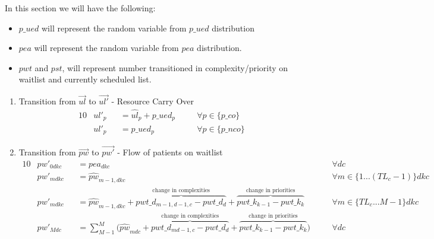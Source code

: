 In this section we will have the following:
\begin{itemize}
	\item $p\_ued$ will represent the random variable from $p\_ued$ distribution 
	\item $pea$ will represent the random variable from $pea$ distribution. 
	\item $pwt$ and $pst$, will represent number transitioned in complexity/priority on waitlist and currently scheduled list.
\end{itemize}


\begin{enumerate}
	\item Transition from $\vec{ul}$ to $\vec{ul'}$ - Resource Carry Over
	\begin{alignat}{10}
		& ul'_{p} 
		&& = \hat{ul}_{p} + p\_ued_{p} \quad 
		&& \forall p \in \{ p\_co \} \\
		& ul'_{p} 
		&& = p\_ued_{p} \quad 
		&& \forall p \in \{ p\_nco \} 
	\end{alignat} 
	
	
	\item Transition from $\vec{pw}$ to $\vec{pw'}$ - Flow of patients on waitlist
	\begin{alignat}{10}
		& pw'_{0dkc} 
			&& = pea_{dkc} \quad
			&& \forall dc \\  
		& pw'_{mdkc} 
			&& = \hat{pw}_{m-1,dkc}
			&& \forall m \in \{ 1...(TL_{c}-1) \} dkc \\  
		& pw'_{mdkc} 
			&& = \hat{pw}_{m-1,dkc} + 
				\overbrace{pwt\_d_{m-1,d-1,c} - pwt\_d_{d}}^\text{
				change in complexities} +  
				\overbrace{pwt\_k_{k-1} - pwt\_k_{k}}^\text{
				change in priorities}\quad 
			&& \forall m \in \{ TL_{c}...M-1 \} dkc \\  
		& pw'_{Mdc} 
			&& = \sum_{M-1}^{M} \big( 
				\hat{pw}_{mdc} + 
				\overbrace{pwt\_d_{md-1,c} - pwt\_d_{d}}^\text{
				change in complexities} +  
				\overbrace{pwt\_k_{k-1} - pwt\_k_{k}}^\text{
				change in priorities} \big) \quad
			&& \forall dc
	\end{alignat}
	

\end{enumerate}
